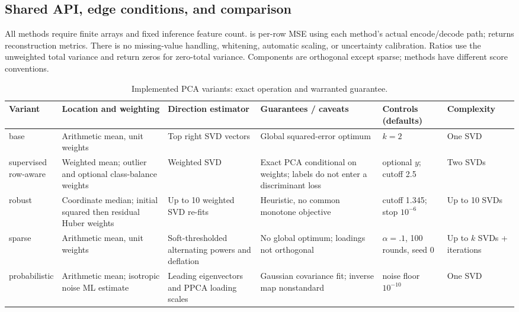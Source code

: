 \documentclass[conference]{IEEEtran}
\begin{document}
\subsection{Shared API, edge conditions, and comparison}
All methods require finite arrays and fixed inference feature count.  is per-row MSE using each method's actual encode/decode path;  returns reconstruction metrics. There is no missing-value handling, whitening, automatic scaling, or uncertainty calibration. Ratios use the unweighted total variance and return zeros for zero-total variance. Components are orthogonal except sparse; methods have different score conventions.
\begin{table}[t]\caption{Implemented PCA variants: exact operation and warranted guarantee.}\label{tab:variants}\centering\scriptsize
\setlength{\tabcolsep}{1pt}\begin{tabular}{p{1.45cm}p{2.5cm}p{2.5cm}p{2.55cm}p{2.4cm}p{1.6cm}}\toprule
Variant & Location and weighting & Direction estimator & Guarantees / caveats & Controls (defaults) & Complexity\\\midrule
base & Arithmetic mean, unit weights & Top right SVD vectors & Global squared-error optimum & \(k=2\) & One SVD\\
\shortstack{supervised\\row-aware} & Weighted mean; outlier and optional class-balance weights & Weighted SVD & Exact PCA conditional on weights; labels do not enter a discriminant loss & optional \(y\); cutoff 2.5 & Two SVDs\\
robust & Coordinate median; initial squared then residual Huber weights & Up to 10 weighted SVD re-fits & Heuristic, no common monotone objective & cutoff 1.345; stop \(10^{-6}\) & Up to 10 SVDs\\
sparse & Arithmetic mean, unit weights & Soft-thresholded alternating powers and deflation & No global optimum; loadings not orthogonal & \(\alpha=.1\), 100 rounds, seed 0 & Up to \(k\) SVDs + iterations\\
probabilistic & Arithmetic mean; isotropic noise ML estimate & Leading eigenvectors and PPCA loading scales & Gaussian covariance fit; inverse map nonstandard & noise floor \(10^{-10}\) & One SVD\\\bottomrule
\end{tabular}\end{table}
\end{document}
